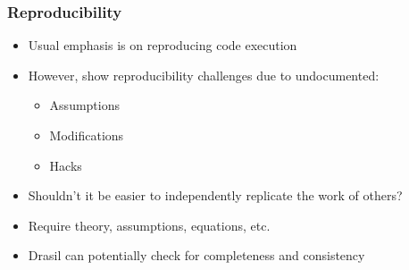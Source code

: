 \documentclass[t,12pt,numbers,fleqn]{beamer}
\begin{document}

\begin{frame}

\frametitle{Reproducibility}

\begin{itemize}
\item Usual emphasis is on reproducing code execution
\item However, \cite{IonescuAndJansson2013} show reproducibility challenges due to
undocumented:
\begin{itemize}
\item Assumptions
\item Modifications
\item Hacks
\end{itemize}
\item Shouldn't it be easier to independently replicate the work of others?
\item Require theory, assumptions, equations, etc.
\item Drasil can potentially check for completeness and consistency
\end{itemize}

\end{frame}

\end{document}

